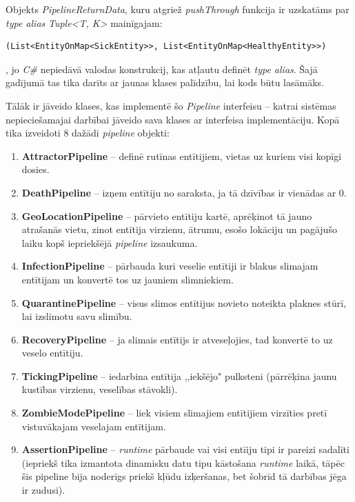 Objekts \emph{PipelineReturnData}, kuru atgriež \emph{pushThrough} funkcija ir
uzskatāms par \emph{type alias} \emph{Tuple<T, K>} mainīgajam:

{
\begin{verbatim}
(List<EntityOnMap<SickEntity>>, List<EntityOnMap<HealthyEntity>>)
\end{verbatim}
}

, jo \emph{C\#} nepiedāvā valodas konstrukcij, kas atļautu definēt
\emph{type alias}. Šajā gadījumā tas tika darīts ar jaunas klases palīdzību, lai kods būtu lasāmāks.

Tālāk ir jāveido klases, kas implementē šo \emph{Pipeline} interfeisu -- katrai sistēmas
nepieciešamajai darbībai jāveido sava klases ar interfeisa implementāciju. Kopā
tika izveidoti 8 dažādi \emph{pipeline} objekti:

\begin{enumerate}
    \item \textbf{AttractorPipeline} -- definē rutīnas entītijiem, vietas uz kuriem visi kopīgi dosies.
    \item \textbf{DeathPipeline} -- izņem entītiju no saraksta, ja tā dzīvības ir vienādas ar \(0\).
    \item \textbf{GeoLocationPipeline} -- pārvieto entītiju kartē, aprēķinot tā jauno
        atrašanās vietu, zinot entītija virzienu, ātrumu, esošo lokāciju un pagājušo
        laiku kopš iepriekšējā \emph{pipeline} izsaukuma.
    \item \textbf{InfectionPipeline} -- pārbauda kuri veselie entītiji ir blakus slimajam
        entītijam un konvertē tos uz jauniem slimniekiem.
    \item \textbf{QuarantinePipeline} -- visus slimos entītijus novieto noteikta plaknes
        stūrī, lai izslimotu savu slimību.
    \item \textbf{RecoveryPipeline} -- ja slimais entītijs ir atveseļojies, tad konvertē to uz veselo entītiju.
    \item \textbf{TickingPipeline} -- iedarbina entītija ,,iekšējo" pulksteni (pārrēķina jaunu kustības virzienu, veselības stāvokli).
    \item \textbf{ZombieModePipeline} -- liek visiem slimajiem entītijiem virzīties pretī vistuvākajam veselajam entītijam.
    \item \textbf{AssertionPipeline} -- \emph{runtime} pārbaude vai visi entīiju tipi ir
        pareizi sadalīti (iepriekš tika izmantota dinamisku datu tipu
        kāstošana \emph{runtime} laikā, tāpēc šis pipeline bija
        noderīgs priekš kļūdu izķeršanas, bet šobrīd tā darbības jēga ir zudusi).
\end{enumerate}

